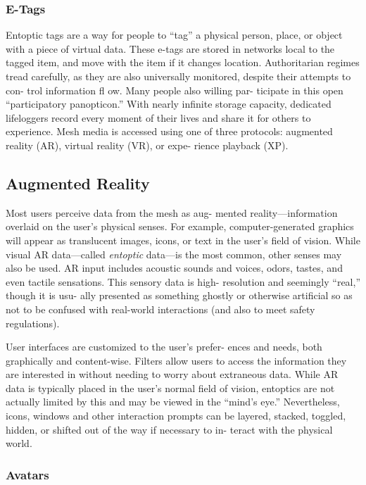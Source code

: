 \subsubsection{E-Tags}

Entoptic tags are a way for people to ``tag'' a physical 
person, place, or object with a piece of virtual data. 
These e-tags are stored in networks local to the tagged 
item, and move with the item if it changes location. 
Authoritarian regimes tread carefully, as they are also 
universally monitored, despite their attempts to con-
trol information fl ow. Many people also willing par-
ticipate in this open ``participatory panopticon.'' With 
nearly infinite storage capacity, dedicated lifeloggers 
record every moment of their lives and share it for 
others to experience.
Mesh media is accessed using one of three protocols: 
augmented reality (AR), virtual reality (VR), or expe-
rience playback (XP).

\subsection{Augmented Reality}

Most users perceive data from the mesh as aug-
mented reality—information overlaid on the user's 
physical senses. For example, computer-generated 
graphics will appear as translucent images, icons, 
or text in the user's field of vision. While visual AR 
data—called  \textit{entoptic} data—is the most common, 
other senses may also be used. AR input includes 
acoustic sounds and voices, odors, tastes, and 
even tactile sensations. This sensory data is high-
resolution and seemingly ``real,'' though it is usu-
ally presented as something ghostly or otherwise 
artificial so as not to be confused with real-world 
interactions (and also to meet safety regulations).

User interfaces are customized to the user's prefer-
ences and needs, both graphically and content-wise. 
Filters allow users to access the information they 
are interested in without needing to worry about 
extraneous data. While AR data is typically placed 
in the user's normal field of vision, entoptics are not 
actually limited by this and may be viewed in the 
``mind's eye.'' Nevertheless, icons, windows and other 
interaction prompts can be layered, stacked, toggled, 
hidden, or shifted out of the way if necessary to in-
teract with the physical world.

\subsubsection{Avatars}


